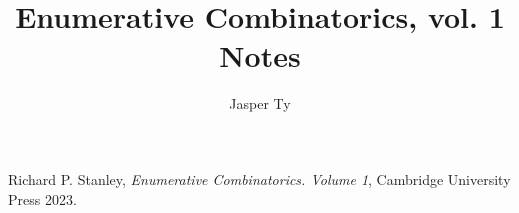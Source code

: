 \documentclass{article}
\title{Enumerative Combinatorics, vol. 1 Notes}
\author{Jasper Ty}
\date{}
\begin{document}
\maketitle

\tableofcontents

\begin{thebibliography}{999999999}
    \footnotesize \raggedright
    Richard P. Stanley, \textit{Enumerative Combinatorics. Volume 1}, Cambridge University Press 2023.

\end{thebibliography}
\end{document}
